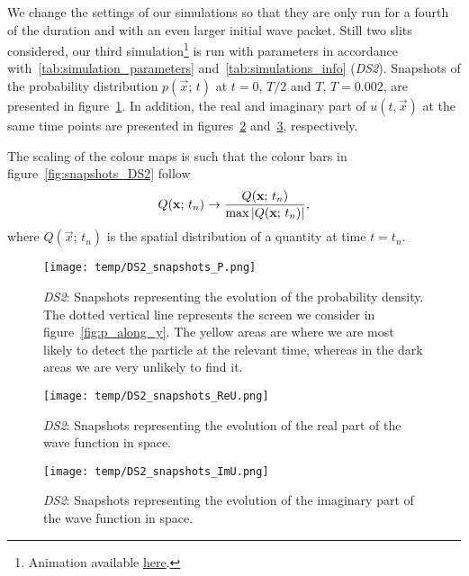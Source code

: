     We change the settings of our simulations so that they are only run for a fourth of the duration and with an even larger initial wave packet. Still two slits considered, our third simulation\footnote{Animation available \href{\animlink/DS2_anim.mp4}{here}.} is run with parameters in accordance with~\ref{tab:simulation_parameters} and~\ref{tab:simulations_info} (\textit{DS2}). Snapshots of the probability distribution $p(\vec{x};\, t)$ at $t=0$, $T/2$ and $T$, $T=0.002$, are presented in figure~\ref{fig:snapshots_p_DS2}. In addition, the real and imaginary part of $u(t, \vec{x})$ at the same time points are presented in figures~\ref{fig:snapshots_ReU_DS2} and~\ref{fig:snapshots_ImU_DS2}, respectively.

    The scaling of the colour maps is such that the colour bars in figure~\ref{fig:snapshots_DS2} follow
    \begin{equation}\label{eq:normalisation_cmaps}
        Q(\mathbf{x};\, t_n) \to \frac{Q(\mathbf{x};\, t_n)}{\max{\abs{Q(\mathbf{x};\, t_n)}}},
    \end{equation}
    where $Q(\vec{x};\, t_n)$ is the spatial distribution of a quantity at time $t=t_n$. 


    \begin{figure*}
        \centering
        \begin{subfigure}{0.96\textwidth}
            \texttt{[image: temp/DS2\_snapshots\_P.png]}
            \caption{\textit{DS2}: Snapshots representing the evolution of the probability density. The dotted vertical line represents the screen we consider in figure~\ref{fig:p_along_y}. The yellow areas are where we are most likely to detect the particle at the relevant time, whereas in the dark areas we are very unlikely to find it.}
            \label{fig:snapshots_p_DS2}
        \end{subfigure}
        \hfill
        \begin{subfigure}{0.96\textwidth}
            \texttt{[image: temp/DS2\_snapshots\_ReU.png]}
            \caption{\textit{DS2}: Snapshots representing the evolution of the real part of the wave function in space. }
            \label{fig:snapshots_ReU_DS2}
        \end{subfigure}
        \hfill
        \begin{subfigure}{0.96\textwidth}
            \texttt{[image: temp/DS2\_snapshots\_ImU.png]}
            \caption{\textit{DS2}: Snapshots representing the evolution of the imaginary part of the wave function in space.}
            \label{fig:snapshots_ImU_DS2}
        \end{subfigure}
        \caption{Colour maps showing the solution of the Schrödinger equation for the \textit{DS2} setup at times $t=0.000,\, 0.001, \,0.002$. The walls that set up the slits are illustrated by the green rectangles. Each map have been scaled using the absolute maximum of the quantity at the current time point. }
        \label{fig:snapshots_DS2}
    \end{figure*}





